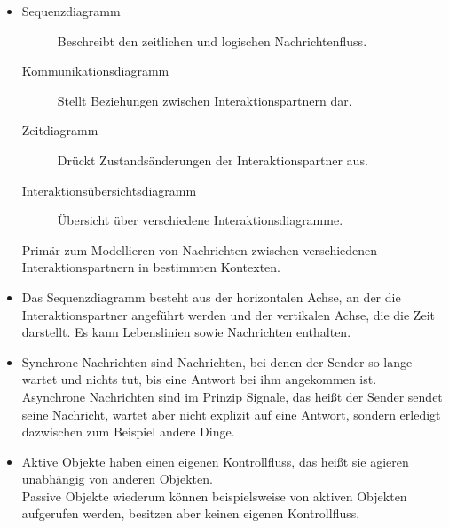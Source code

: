 \documentclass[a4paper, 12pt, margins=2.5cm]{homework}
\begin{document}
  \begin{problem}
    
  \end{problem}
  \begin{solution} \hfill
    \begin{itemize}
      \item
        \begin{description}
          \item[Sequenzdiagramm] Beschreibt den zeitlichen und logischen
                Nachrichtenfluss.
          \item[Kommunikationsdiagramm] Stellt Beziehungen zwischen Interaktionspartnern
                dar.
          \item[Zeitdiagramm] Drückt Zustandsänderungen der Interaktionspartner aus.
          \item[Interaktionsübersichtsdiagramm] Übersicht über verschiedene Interaktionsdiagramme.
        \end{description}
        Primär zum Modellieren von Nachrichten zwischen verschiedenen Interaktionspartnern
        in bestimmten Kontexten. 

      \item Das Sequenzdiagramm besteht aus der horizontalen Achse, an der die 
            Interaktionspartner angeführt werden und der vertikalen Achse, die 
            die Zeit darstellt.
            Es kann Lebenslinien sowie Nachrichten enthalten.
      
      \item Synchrone Nachrichten sind Nachrichten, bei denen der Sender so lange wartet
            und nichts tut, bis eine Antwort bei ihm angekommen ist. \\
            Asynchrone Nachrichten sind im Prinzip Signale, das heißt der Sender
            sendet seine Nachricht, wartet aber nicht explizit auf eine Antwort, sondern
            erledigt dazwischen zum Beispiel andere Dinge.

      \item Aktive Objekte haben einen eigenen Kontrollfluss, das heißt sie agieren
            unabhängig von anderen Objekten. \\
            Passive Objekte wiederum können beispielsweise von aktiven Objekten
            aufgerufen werden, besitzen aber keinen eigenen Kontrollfluss.
    \end{itemize}
  \end{solution}
\end{document}
